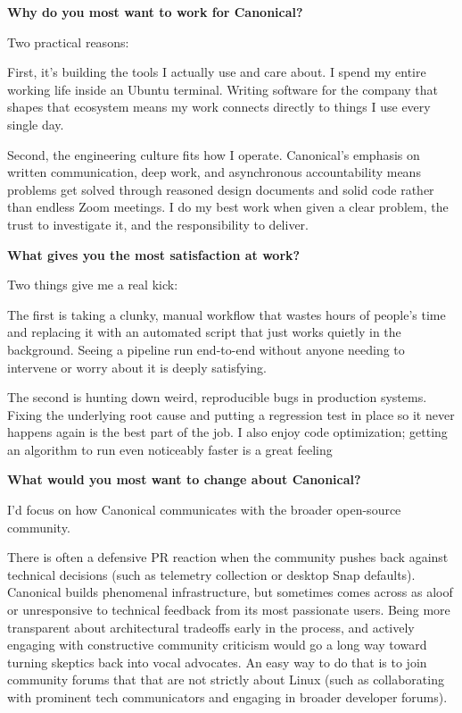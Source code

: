 \documentclass[letterpaper,11pt]{article}
\newcommand{\interviewQuestion}[1]{%
  \vspace{8pt}%
  \textbf{\color{airforceblue}#1}\par%
}
\begin{document}
\interviewQuestion{Why do you most want to work for Canonical?}

Two practical reasons:

First, it's building the tools I actually use and care about. I spend my entire working life inside an Ubuntu terminal. Writing software for the company that shapes that ecosystem means my work connects directly to things I use every single day.

Second, the engineering culture fits how I operate. Canonical's emphasis on written communication, deep work, and asynchronous accountability means problems get solved through reasoned design documents and solid code rather than endless Zoom meetings. I do my best work when given a clear problem, the trust to investigate it, and the responsibility to deliver.

\interviewQuestion{What gives you the most satisfaction at work?}

Two things give me a real kick:

The first is taking a clunky, manual workflow that wastes hours of people's time and replacing it with an automated script that just works quietly in the background. Seeing a pipeline run end-to-end without anyone needing to intervene or worry about it is deeply satisfying.

The second is hunting down weird, reproducible bugs in production systems. Fixing the underlying root cause and putting a regression test in place so it never happens again is the best part of the job. I also enjoy code optimization; getting an algorithm to run even noticeably faster is a great feeling

\interviewQuestion{What would you most want to change about Canonical?}

I'd focus on how Canonical communicates with the broader open-source community.

There is often a defensive PR reaction when the community pushes back against technical decisions (such as telemetry collection or desktop Snap defaults). Canonical builds phenomenal infrastructure, but sometimes comes across as aloof or unresponsive to technical feedback from its most passionate users. Being more transparent about architectural tradeoffs early in the process, and actively engaging with constructive community criticism would go a long way toward turning skeptics back into vocal advocates. An easy way to do that is to join community forums that that are not strictly about Linux (such as collaborating with prominent tech communicators and engaging in broader developer forums).
\end{document}
